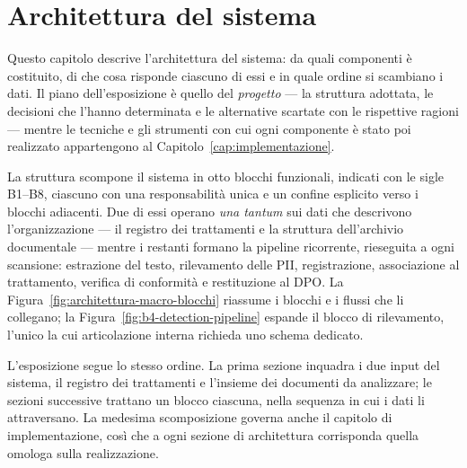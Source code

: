 \chapter{Architettura del sistema}
\label{cap:architettura}

Questo capitolo descrive l'architettura del sistema: da quali componenti è costituito, di che cosa risponde ciascuno di essi e in quale ordine si scambiano i dati. Il piano dell'esposizione è quello del \emph{progetto} --- la struttura adottata, le decisioni che l'hanno determinata e le alternative scartate con le rispettive ragioni --- mentre le tecniche e gli strumenti con cui ogni componente è stato poi realizzato appartengono al Capitolo~\ref{cap:implementazione}.

La struttura scompone il sistema in otto blocchi funzionali, indicati con le sigle B1--B8, ciascuno con una responsabilità unica e un confine esplicito verso i blocchi adiacenti. Due di essi operano \emph{una tantum} sui dati che descrivono l'organizzazione --- il registro dei trattamenti e la struttura dell'archivio documentale --- mentre i restanti formano la pipeline ricorrente, rieseguita a ogni scansione: estrazione del testo, rilevamento delle PII, registrazione, associazione al trattamento, verifica di conformità e restituzione al DPO. La Figura~\ref{fig:architettura-macro-blocchi} riassume i blocchi e i flussi che li collegano; la Figura~\ref{fig:b4-detection-pipeline} espande il blocco di rilevamento, l'unico la cui articolazione interna richieda uno schema dedicato.

L'esposizione segue lo stesso ordine. La prima sezione inquadra i due input del sistema, il registro dei trattamenti e l'insieme dei documenti da analizzare; le sezioni successive trattano un blocco ciascuna, nella sequenza in cui i dati li attraversano. La medesima scomposizione governa anche il capitolo di implementazione, così che a ogni sezione di architettura corrisponda quella omologa sulla realizzazione.

